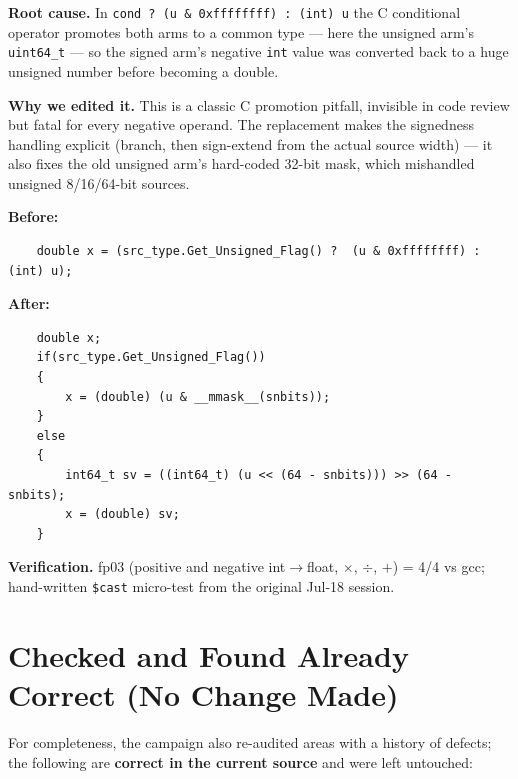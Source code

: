 \documentclass[11pt,a4paper]{report}
\begin{document}
\textbf{Root cause.} In
\texttt{cond ? (u \& 0xffffffff) : (int) u}
the C conditional operator promotes both arms to a common type --- here the
unsigned arm's \texttt{uint64\_t} --- so the signed arm's negative
\texttt{int} value was converted back to a huge unsigned number before
becoming a double.

\textbf{Why we edited it.} This is a classic C promotion pitfall, invisible
in code review but fatal for every negative operand. The replacement makes
the signedness handling explicit (branch, then sign-extend from the actual
source width) --- it also fixes the old unsigned arm's hard-coded 32-bit
mask, which mishandled unsigned 8/16/64-bit sources.

\textbf{Before:}
\begin{lstlisting}
    double x = (src_type.Get_Unsigned_Flag() ?  (u & 0xffffffff) : (int) u);
\end{lstlisting}

\textbf{After:}
\begin{lstlisting}
    double x;
    if(src_type.Get_Unsigned_Flag())
    {
        x = (double) (u & __mmask__(snbits));
    }
    else
    {
        int64_t sv = ((int64_t) (u << (64 - snbits))) >> (64 - snbits);
        x = (double) sv;
    }
\end{lstlisting}

\textbf{Verification.} fp03 (positive and negative int$\to$float, $\times$,
$\div$, $+$) = 4/4 vs gcc; hand-written \texttt{\$cast} micro-test from the
original Jul-18 session.

\chapter{Checked and Found Already Correct (No Change Made)}

For completeness, the campaign also re-audited areas with a history of
defects; the following are \textbf{correct in the current source} and were
left untouched:
\end{document}
